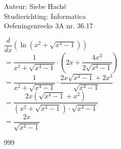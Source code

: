 \documentclass[a4paper]{article}
\begin{document}
\noindent \large Auteur: Siebe Haché \\
\noindent \large Studierichting: Informatica \\
\noindent \large Oefeningenreeks 3A nr. 36.17 \\

\medskip
\normalsize

$\dfrac{d}{dx}\left(\ln\left(x^2 + \sqrt{x^4-1}\right)\right)$ \\

$= \dfrac{1}{x^2+\sqrt{x^4-1}} \cdot \left(2x + \dfrac{4x^3}{2\sqrt{x^4-1}}\right)$ \\

$= \dfrac{1}{x^2+\sqrt{x^4-1}} \cdot \dfrac{2x\sqrt{x^4-1}+2x^3}{\sqrt{x^4-1}}$ \\

$= \dfrac{2x\left(\sqrt{x^4-1}+x^2\right)}{\left(x^2+\sqrt{x^4-1}\right)\cdot\sqrt{x^4-1}}$ \\

$= \dfrac{2x}{\sqrt{x^4-1}}$ \\

\begin{thebibliography}{999}
\end{thebibliography}
\end{document}
